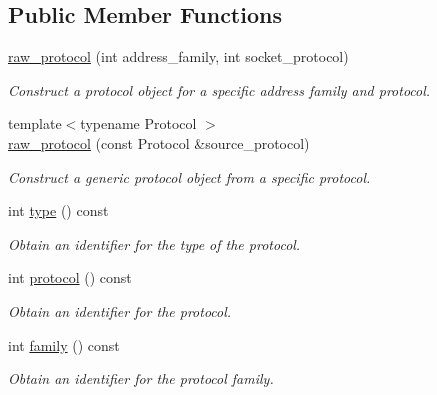 \subsection*{Public Member Functions}
\begin{DoxyCompactItemize}
\item 
\hyperlink{classasio_1_1generic_1_1raw__protocol_ac579d774e2ae8a6bb023182498d9b916}{raw\+\_\+protocol} (int address\+\_\+family, int socket\+\_\+protocol)
\begin{DoxyCompactList}\small\item\em Construct a protocol object for a specific address family and protocol. \end{DoxyCompactList}\item 
{\footnotesize template$<$typename Protocol $>$ }\\\hyperlink{classasio_1_1generic_1_1raw__protocol_a8feeb303fed2993b28c6f1227bedb3a4}{raw\+\_\+protocol} (const Protocol \&source\+\_\+protocol)
\begin{DoxyCompactList}\small\item\em Construct a generic protocol object from a specific protocol. \end{DoxyCompactList}\item 
int \hyperlink{classasio_1_1generic_1_1raw__protocol_ac777a59061e527587bdd6a1fea93b421}{type} () const 
\begin{DoxyCompactList}\small\item\em Obtain an identifier for the type of the protocol. \end{DoxyCompactList}\item 
int \hyperlink{classasio_1_1generic_1_1raw__protocol_a648aa00ee96238180b6f2ffc51b0b3a1}{protocol} () const 
\begin{DoxyCompactList}\small\item\em Obtain an identifier for the protocol. \end{DoxyCompactList}\item 
int \hyperlink{classasio_1_1generic_1_1raw__protocol_ac19520ab1c343c82c3456b481b64b585}{family} () const 
\begin{DoxyCompactList}\small\item\em Obtain an identifier for the protocol family. \end{DoxyCompactList}\end{DoxyCompactItemize}
